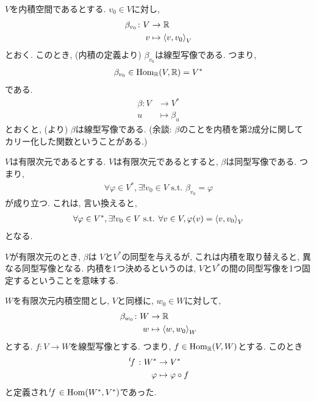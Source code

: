   $V$を内積空間であるとする.
  $v_0\in V$に対し,
  \begin{align*}
    \beta_{v_0}\colon
    V&\to \mathbb{R}\\
    v&\mapsto \Braket{v,v_0}_V
  \end{align*}
  とおく.
  このとき, (内積の定義より)
  $\beta_{v_0}$は線型写像である.
  つまり,
  \begin{align*}
    \beta_{v_0} \in \operatorname{Hom}_{\mathbb{R}}(V,\mathbb{R}) =V^\ast
  \end{align*}
  である.
  \begin{align*}
    \beta\colon
    V&\to V^\ast\\
    u&\mapsto \beta_{u}
  \end{align*}
  とおくと,
  (より)
  $\beta$は線型写像である.
  (余談: $\beta$のことを内積を第2成分に関して
  カリー化した関数ということがある.)

  $V$は有限次元であるとする.
  $V$は有限次元であるとすると,
  $\beta$は同型写像である.
  つまり,
  \begin{align*}
    \forall \varphi \in V^\ast,
    \exists ! v_0 \in V \text{ s.t. }
    \beta_{v_0} = \varphi
  \end{align*}
  が成り立つ.
  これは, 言い換えると,
  \begin{align*}
    \forall \varphi \in V^\ast,
    \exists ! v_0 \in V \text{ s.t. }
    \forall v\in V, \varphi(v)=\Braket{v,v_0}_V
  \end{align*}
  となる.

\begin{remark}
  $V$が有限次元のとき,
  $\beta$は
  $V$と$V^\ast$の同型を与えるが,
  これは内積を取り替えると,
  異なる同型写像となる.
  内積を1つ決めるというのは,
  $V$と$V^\ast$の間の同型写像を1つ固定するということを意味する.
\end{remark}

$W$を有限次元内積空間とし,
$V$と同様に,
$w_0\in W$に対して,
\begin{align*}
  \beta_{w_0}\colon
  W&\to \mathbb{R}\\
  w&\mapsto \Braket{w,w_0}_W
\end{align*}
とする.
$f\colon V\to W$を線型写像とする.
つまり, $f\in \operatorname{Hom}_{\mathbb{R}}(V,W)$とする.
このとき
\begin{align*}
  \left.^{t}\!f\right.\colon
  W^\ast &\to V^\ast\\
  \varphi &\mapsto \varphi\circ f
\end{align*}
と定義され$\left.^{t}\!f\right.\in \operatorname{Hom}(W^\ast,V^\ast)$であった.

